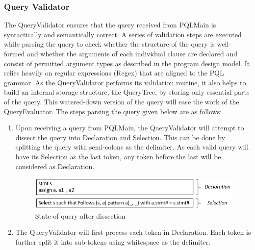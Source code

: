 \documentclass[12pt]{article}
\begin{document}
{{{{{{{{{{\subsubsection{Query Validator}
The QueryValidator ensures that the query received from PQLMain is syntactically and semantically correct. A series of validation steps are executed while parsing the query to check whether the structure of the query is well-formed and whether the arguments of each individual clause are declared and consist of permitted argument types as described in the program design model. It relies heavily on regular expressions (Regex) that are aligned to the PQL grammar. As the QueryValidator performs its validation routine, it also helps to build an internal storage structure, the QueryTree, by storing only essential parts of the query. This watered-down version of the query will ease the work of the QueryEvaluator. \newline
The steps parsing the query given below are as follows:
\begin{center}
\end{center}
\vspace{4mm}
\begin{enumerate}
\item Upon receiving a query from PQLMain, the QueryValidator will attempt to dissect the query into Declaration and Selection. This can be done by splitting the query with semi-colons as the delimiter. As each valid query will have its Selection as the last token, any token before the last will be considered as Declaration.
\begin{figure}[htbp]
  \caption{State of query after dissection}
  \centering 
 \includegraphics[width=1.0\textwidth]{DissectedQuery.png}
\end{figure}
\item The QueryValidator will first process each token in Declaration. Each token is further split it into sub-tokens using whitespace as the delimiter.

\end{enumerate}}}}}}}}}}}
\end{document}
